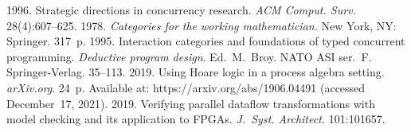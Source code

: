    






\vspace*{12pt}

  \begin{multicols}{2}

\renewcommand{\bibname}{\protect\rmfamily References}

{\small\frenchspacing
 {%
 \begin{thebibliography}{99}
   
    1996. Strategic directions in concurrency research. 
\textit{ACM Comput. Surv.} 28(4):607--625.
    1978. \textit{Categories for the working mathematician.} New York, NY: 
Springer. 317~p.
    1995. Interaction categories and 
foundations of typed concurrent programming. \textit{Deductive program design}.
Ed.\ M.~Broy. NATO ASI ser.~F. Springer-Verlag. 35--113.
    2019. Using Hoare logic in a process algebra 
setting. \textit{arXiv.org}. 24~p. Available at: {\sf https://arxiv.org/abs/1906.04491} (accessed 
December~17, 2021).
2019. Verifying parallel dataflow transformations with model checking and its application to 
FPGAs. \textit{J.~Syst. Architect.} 101:101657.

\columnbreak


\end{thebibliography}}}
\end{multicols}
